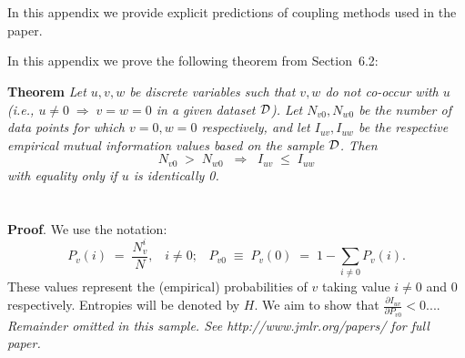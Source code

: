 \documentclass[twoside,11pt]{article}
\newcommand{\dataset}{{\cal D}}
\newcommand{\fracpartial}[2]{\frac{\partial #1}{\partial  #2}}
\begin{document}



\newpage

\appendix
\section{}
\label{app:explicit}



In this appendix we provide explicit predictions of coupling methods used in the paper.



In this appendix we prove the following theorem from
Section~6.2:

\noindent
{\bf Theorem} {\it Let $u,v,w$ be discrete variables such that $v, w$ do
not co-occur with $u$ (i.e., $u\neq0\;\Rightarrow \;v=w=0$ in a given
dataset $\dataset$). Let $N_{v0},N_{w0}$ be the number of data points for
which $v=0, w=0$ respectively, and let $I_{uv},I_{uw}$ be the
respective empirical mutual information values based on the sample
$\dataset$. Then
\[
	N_{v0} \;>\; N_{w0}\;\;\Rightarrow\;\;I_{uv} \;\leq\;I_{uw}
\]
with equality only if $u$ is identically 0.} \hfill\BlackBox

\section{}

\noindent
{\bf Proof}. We use the notation:
\[
P_v(i) \;=\;\frac{N_v^i}{N},\;\;\;i \neq 0;\;\;\;
P_{v0}\;\equiv\;P_v(0)\; = \;1 - \sum_{i\neq 0}P_v(i).
\]
These values represent the (empirical) probabilities of $v$
taking value $i\neq 0$ and 0 respectively.  Entropies will be denoted
by $H$. We aim to show that $\fracpartial{I_{uv}}{P_{v0}} < 0$....\\

{\noindent \em Remainder omitted in this sample. See http://www.jmlr.org/papers/ for full paper.}


\vskip 0.2in 

\end{document}
